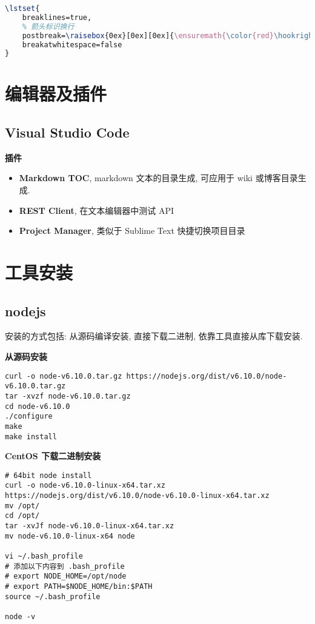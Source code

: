 \begin{lstlisting}[language=TeX]
\lstset{
    breaklines=true,
    % 箭头标识换行
    postbreak=\raisebox{0ex}[0ex][0ex]{\ensuremath{\color{red}\hookrightarrow\space}},
    breakatwhitespace=false
}
\end{lstlisting}

\section{编辑器及插件}\label{ux7f16ux8f91ux5668ux53caux63d2ux4ef6}

\subsection{Visual Studio Code}\label{visual-studio-code}

\textbf{插件}

\begin{itemize}
\tightlist
\item
  \textbf{Markdown TOC}, markdown 文本的目录生成, 可应用于 wiki
  或博客目录生成.
\item
  \textbf{REST Client}, 在文本编辑器中测试 API
\item
  \textbf{Project Manager}, 类似于 Sublime Text 快捷切换项目目录
\end{itemize}

\section{工具安装}\label{ux5de5ux5177ux5b89ux88c5}

\subsection{nodejs}\label{nodejs}

安装的方式包括: 从源码编译安装, 直接下载二进制,
依靠工具直接从库下载安装.

\textbf{从源码安装}

\begin{lstlisting}
curl -o node-v6.10.0.tar.gz https://nodejs.org/dist/v6.10.0/node-v6.10.0.tar.gz
tar -xvzf node-v6.10.0.tar.gz
cd node-v6.10.0
./configure
make
make install
\end{lstlisting}

\textbf{CentOS 下载二进制安装}

\begin{lstlisting}
# 64bit node install
curl -o node-v6.10.0-linux-x64.tar.xz https://nodejs.org/dist/v6.10.0/node-v6.10.0-linux-x64.tar.xz
mv /opt/
cd /opt/
tar -xvJf node-v6.10.0-linux-x64.tar.xz
mv node-v6.10.0-linux-x64 node

vi ~/.bash_profile
# 添加以下内容到 .bash_profile
# export NODE_HOME=/opt/node
# export PATH=$NODE_HOME/bin:$PATH
source ~/.bash_profile

node -v
\end{lstlisting}


